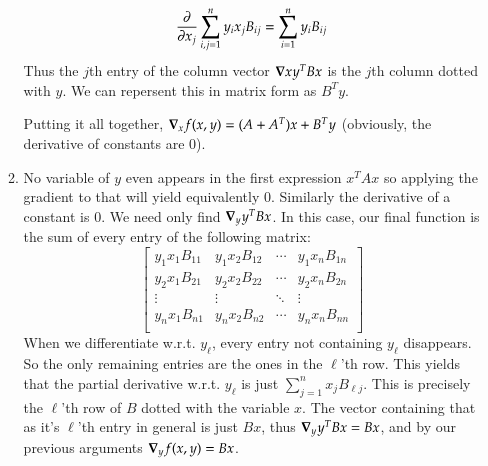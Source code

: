 \documentclass[12pt]{article}
\theoremstyle{definitionstyle}
\begin{document}
\begin{enumerate}[leftmargin=\labelsep]
\begin{enumerate}
		\begin{align*}
			\pdv{x_j} \sum_{i,j=1}^n y_ix_jB_{ij} = \sum_{i=1}^n y_iB_{ij}
		\end{align*}
		Thus the $j$th entry of the column vector $\grad x y^TBx$ is the $j$th column dotted with $y$. We can repersent this in matrix form as $B^Ty$.

		Putting it all together, $\grad_x f(x,y) = (A+A^T)x + B^Ty$ (obviously, the derivative of constants are 0).
		
		\item No variable of $y$ even appears in the first expression $x^TAx$ so applying the gradient to that will yield equivalently 0. Similarly the derivative of a constant is 0. We need only find $\grad_y y^TBx$. In this case, our final function is the sum of every entry of the following matrix:
		$$\begin{bmatrix} 
			y_1x_1B_{11} & y_1x_2B_{12} & \cdots & y_1x_nB_{1n} \\
			y_2x_1B_{21} & y_2x_2B_{22} & \cdots & y_2x_nB_{2n} \\
			\vdots & \vdots & \ddots & \vdots \\
			y_nx_1B_{n1} & y_nx_2B_{n2} & \cdots & y_nx_nB_{nn} \\
		\end{bmatrix}$$
		When we differentiate w.r.t. $y_\ell$, every entry not containing $y_\ell$ disappears. So the only remaining entries are the ones in the $\ell$'th row. This yields that the partial derivative w.r.t. $y_\ell$ is just $\sum_{j=1}^n x_jB_{\ell j}$. This is precisely the $\ell$'th row of $B$ dotted with the variable $x$. The vector containing that as it's $\ell$'th entry in general is just $Bx$, thus $\grad_y y^TBx = Bx$, and by our previous arguments $\grad_y f(x,y) = Bx$.
		\end{enumerate}
		

\end{enumerate}
\end{document}

